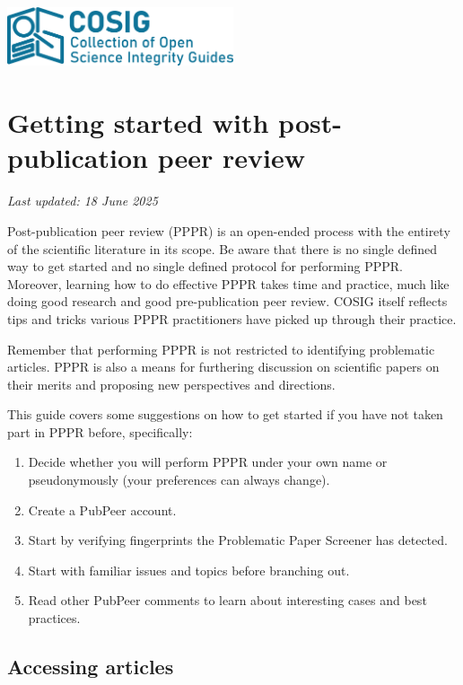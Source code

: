 \documentclass[letterpaper, 12pt]{article}
\begin{document}
\flushleft
\includegraphics[width=0.5\textwidth]{img/home/241017_final_logo_mockup.png}

\section*{Getting started with post-publication peer review}
\textit{Last updated: 18 June 2025}

Post-publication peer review (PPPR) is an open-ended process with the entirety of the scientific literature in its scope. Be aware that there is no single defined way to get started and no single defined protocol for performing PPPR. Moreover, learning how to do effective PPPR takes time and practice, much like doing good research and good pre-publication peer review. COSIG itself reflects tips and tricks various PPPR practitioners have picked up through their practice.

Remember that performing PPPR is not restricted to identifying problematic articles. PPPR is also a means for furthering discussion on scientific papers on their merits and proposing new perspectives and directions.

This guide covers some suggestions on how to get started if you have not taken part in PPPR before, specifically:

\begin{enumerate}
    \setlength\itemsep{-0.5em}
    \item Decide whether you will perform PPPR under your own name or pseudonymously (your preferences can always change).
    \item Create a PubPeer account.
    \item Start by verifying fingerprints the Problematic Paper Screener has detected.
    \item Start with familiar issues and topics before branching out.
    \item Read other PubPeer comments to learn about interesting cases and best practices.
\end{enumerate}

\subsection*{Accessing articles}
\end{document}
